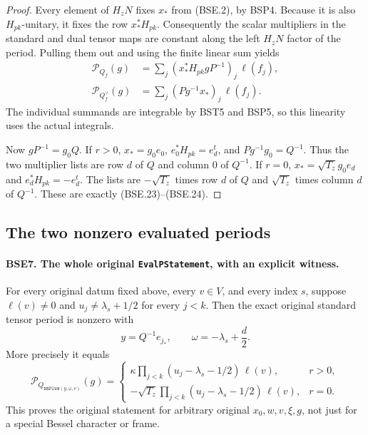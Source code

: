 \begin{proof}
Every element of $H_zN$ fixes $x_*$ from (BSE.2), by BSP4.
Because it is also $H_{pk}$-unitary, it fixes the row $x_*^*H_{pk}$.
Consequently the scalar multipliers in the standard and dual
tensor maps are constant along the left $H_zN$ factor of the
period.  Pulling them out and using the finite linear sum yields
\[
 \begin{split}
 \mathcal P_{Q_f}(g)
     &=\sum_j(x_*^*H_{pk}gP^{-1})_j\,\ell(f_j),\\
 \mathcal P_{Q_f^\vee}(g)
     &=\sum_j(Pg^{-1}x_*)_j\,\ell(f_j).
 \end{split}
 \tag{BSE.25}
\]
The individual summands are integrable by BST5 and BSP5, so this
linearity uses the actual integrals.

Now $gP^{-1}=g_0Q$.
If $r>0$, $x_*=g_0e_0$,
$e_0^*H_{pk}=e_d^t$, and $Pg^{-1}g_0=Q^{-1}$.
Thus the two multiplier lists are row $d$ of $Q$ and column
$0$ of $Q^{-1}$.
If $r=0$, $x_*=\sqrt{T_z}g_0e_d$ and
$e_d^*H_{pk}=-e_d^t$.  The lists are
$-\sqrt{T_z}$ times row $d$ of $Q$ and
$\sqrt{T_z}$ times column $d$ of $Q^{-1}$.
These are exactly (BSE.23)--(BSE.24).
\end{proof}

\subsection{The two nonzero evaluated periods}

\paragraph{BSE7. The whole original \texttt{EvalPStatement}, with an explicit witness.}
\label{claim:BSE7}
For every original datum fixed above, every $v\in V$, and every
index $s$, suppose $\ell(v)\ne0$ and
$u_j\ne\lambda_s+1/2$ for every $j<k$.
Then the exact original standard tensor period is nonzero with
\[
       y=Q^{-1}e_{j_*},\qquad
       \omega=-\lambda_s+\frac d2 .
 \tag{BSE.26}
\]
More precisely it equals
\[
 \mathcal P_{Q_{\texttt{nnPlus}(y,\omega,v)}}(g)
   =
 \begin{cases}
 \displaystyle \kappa\prod_{j<k}(u_j-\lambda_s-1/2)\,\ell(v),
                                                   &r>0,\\[2mm]
 \displaystyle -\sqrt{T_z}\prod_{j<k}(u_j-\lambda_s-1/2)\,\ell(v),
                                                   &r=0 .
 \end{cases}
 \tag{BSE.27}
\]
This proves the original statement for arbitrary original
$x_0,w,v,\xi,g$, not just for a special Bessel character or frame.

